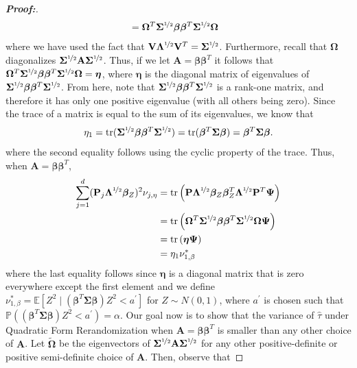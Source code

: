 \documentclass[11pt,twoside]{article}
\theoremstyle{definition}
\theoremstyle{remark}
\begin{document}
\begin{proof}[\textbf{Proof:}]
\begin{align*}
        &= \mathbf{\Omega}^T \mathbf{\Sigma}^{\nicefrac{1}{2}} \bm{\beta} \bm{\beta}^T \mathbf{\Sigma}^{\nicefrac{1}{2}} \mathbf{\Omega}
    \end{align*}
    where we have used the fact that $\mathbf{V} \mathbf{\Lambda}^{\nicefrac{1}{2}} \mathbf{V}^T = \mathbf{\Sigma}^{\nicefrac{1}{2}}$. Furthermore, recall that $\mathbf{\Omega}$ diagonalizes $\mathbf{\Sigma}^{\nicefrac{1}{2}} \mathbf{A} \mathbf{\Sigma}^{\nicefrac{1}{2}}$. Thus, if we let $\mathbf{A} = \bm{\beta} \bm{\beta}^T$ it follows that $\mathbf{\Omega}^T \mathbf{\Sigma}^{\nicefrac{1}{2}} \bm{\beta} \bm{\beta}^T \mathbf{\Sigma}^{\nicefrac{1}{2}} \mathbf{\Omega} = \bm{\eta}$, where $\bm{\eta}$ is the diagonal matrix of eigenvalues of $\mathbf{\Sigma}^{\nicefrac{1}{2}} \bm{\beta} \bm{\beta}^T \mathbf{\Sigma}^{\nicefrac{1}{2}}$. From here, note that $\mathbf{\Sigma}^{\nicefrac{1}{2}} \bm{\beta} \bm{\beta}^T \mathbf{\Sigma}^{\nicefrac{1}{2}}$ is a rank-one matrix, and therefore it has only one positive eigenvalue (with all others being zero). Since the trace of a matrix is equal to the sum of its eigenvalues, we know that
    \begin{align*}
        \eta_1 = \text{tr}(\mathbf{\Sigma}^{\nicefrac{1}{2}} \bm{\beta} \bm{\beta}^T \mathbf{\Sigma}^{\nicefrac{1}{2}}) = \text{tr}( \bm{\beta}^T \mathbf{\Sigma} \bm{\beta}) = \bm{\beta}^T \mathbf{\Sigma} \bm{\beta}.
    \end{align*}
    where the second equality follows using the cyclic property of the trace. Thus, when $\mathbf{A} = \bm{\beta} \bm{\beta}^T$, 
    \begin{align*}
        \sum^d_{j=1} (\mathbf{P}_j \mathbf{\Lambda}^{\nicefrac{1}{2}} \bm{\beta}_Z)^2 \nu_{j, \eta} &= \text{tr}\left(\mathbf{P} \mathbf{\Lambda}^{\nicefrac{1}{2}} \bm{\beta}_Z \bm{\beta}^T_Z \mathbf{\Lambda}^{\nicefrac{1}{2}} \mathbf{P}^T \mathbf{\Psi} \right) \\
        &=\text{tr}\left(\mathbf{\Omega}^T \mathbf{\Sigma}^{\nicefrac{1}{2}} \bm{\beta} \bm{\beta}^T \mathbf{\Sigma}^{\nicefrac{1}{2}} \mathbf{\Omega}\mathbf{\Psi} \right) \\
        &= \text{tr}\left(\bm{\eta} \mathbf{\Psi} \right) \\
        &= \eta_1 \nu^*_{1, \beta}
    \end{align*}
    where the last equality follows since $\bm{\eta}$ is a diagonal matrix that is zero everywhere except the first element and we define $\nu^*_{1, \beta} = \mathbb{E}[Z^2 \mid (\bm{\beta}^T \mathbf{\Sigma} \bm{\beta})Z^2 < a^\prime]$ for $Z \sim N(0, 1)$, where $a^\prime$ is chosen such that $\mathbb{P}( (\bm{\beta}^T \mathbf{\Sigma} \bm{\beta}) Z^2 < a^\prime) = \alpha$. Our goal now is to show that the variance of $\widehat{\tau}$ under Quadratic Form Rerandomization when $\mathbf{A} = \bm{\beta} \bm{\beta}^T$ is smaller than any other choice of $\mathbf{A}$. Let $\widetilde{\mathbf{\Omega}}$ be the eigenvectors of $\mathbf{\Sigma}^{\nicefrac{1}{2}} \mathbf{A} \mathbf{\Sigma}^{\nicefrac{1}{2}}$ for any other positive-definite or positive semi-definite choice of $\mathbf{A}$. Then, observe that

\end{proof}
\end{document}
